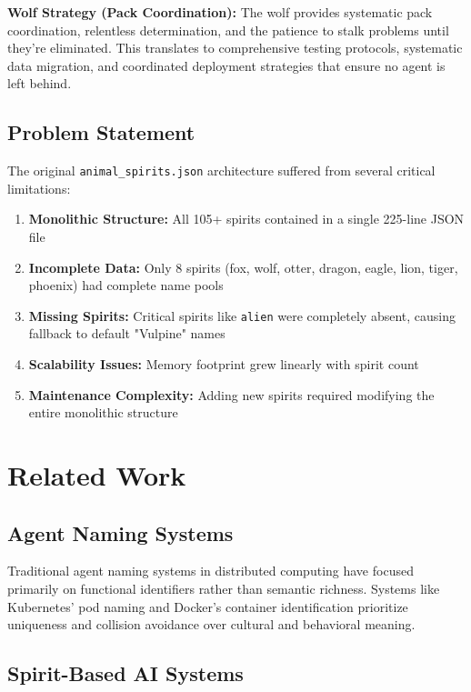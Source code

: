 \documentclass[11pt,a4paper]{article}
\begin{document}
\textbf{Wolf Strategy (Pack Coordination):} The wolf provides systematic pack coordination, relentless determination, and the patience to stalk problems until they're eliminated. This translates to comprehensive testing protocols, systematic data migration, and coordinated deployment strategies that ensure no agent is left behind.

\subsection{Problem Statement}

The original \texttt{animal\_spirits.json} architecture suffered from several critical limitations:

\begin{enumerate}[label=(\roman*)]
    \item \textbf{Monolithic Structure:} All 105+ spirits contained in a single 225-line JSON file
    \item \textbf{Incomplete Data:} Only 8 spirits (fox, wolf, otter, dragon, eagle, lion, tiger, phoenix) had complete name pools
    \item \textbf{Missing Spirits:} Critical spirits like \texttt{alien} were completely absent, causing fallback to default "Vulpine" names
    \item \textbf{Scalability Issues:} Memory footprint grew linearly with spirit count
    \item \textbf{Maintenance Complexity:} Adding new spirits required modifying the entire monolithic structure
\end{enumerate}

\section{Related Work}

\subsection{Agent Naming Systems}

Traditional agent naming systems in distributed computing have focused primarily on functional identifiers rather than semantic richness. Systems like Kubernetes' pod naming \cite{kubernetes-naming} and Docker's container identification \cite{docker-naming} prioritize uniqueness and collision avoidance over cultural and behavioral meaning.

\subsection{Spirit-Based AI Systems}
\end{document}
